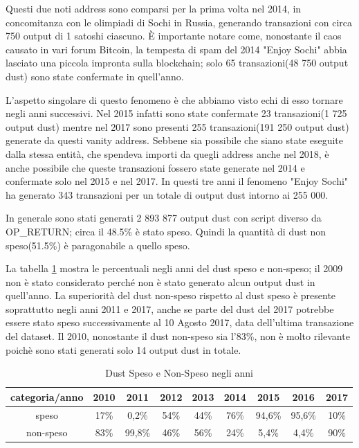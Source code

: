Questi due noti address sono comparsi per la prima volta nel 2014, in concomitanza con le olimpiadi di Sochi in Russia, generando transazioni con circa 750 output di 1 satoshi ciascuno. È importante notare come, nonostante il caos causato in vari forum Bitcoin, la tempesta di spam del 2014 "Enjoy Sochi" abbia lasciato una piccola impronta sulla blockchain; solo 65 transazioni(48 750 output dust) sono state confermate in quell'anno.

L'aspetto singolare di questo fenomeno è che abbiamo visto echi di esso tornare negli anni successivi. Nel 2015 infatti sono state confermate 23 transazioni(1 725 output dust) mentre nel 2017 sono presenti 255 transazioni(191 250 output dust) generate da questi vanity address. Sebbene sia possibile che siano state eseguite dalla stessa entità, che spendeva importi da quegli address anche nel 2018, è anche possibile che queste transazioni fossero state generate nel 2014 e confermate solo nel 2015 e nel 2017. In questi tre anni il fenomeno "Enjoy Sochi" ha generato 343 transazioni per un totale di output dust intorno ai 255 000.

In generale sono stati generati 2 893 877 output dust con script diverso da OP\_RETURN; circa il 48.5\% è stato speso. Quindi la quantità di dust non speso(51.5\%) è paragonabile a quello speso. 

La tabella \ref{tab:dust_spent_unspent} mostra le percentuali negli anni del dust speso e non-speso; il 2009 non è stato considerato perché non è stato generato alcun output dust in quell'anno. La superiorità del dust non-speso rispetto al dust speso è presente soprattutto negli anni 2011 e 2017, anche se parte del dust del 2017 potrebbe essere stato speso successivamente al 10 Agosto 2017, data dell'ultima transazione del dataset. Il 2010, nonostante il dust non-speso sia l'83\%, non è molto rilevante poichè sono stati generati solo 14 output dust in totale. 
\begin{table}[H]
    \centering
    \begin{tabular}{|c|c|c|c|c|c|c|c|c|}
        \hline
           categoria/anno   & 2010 & 2011 & 2012 & 2013 & 2014 & 2015 & 2016 & 2017\\
        \hline 
         speso &  17\% & 0,2\% & 54\% & 44\% & 76\% & 94,6\% & 95,6\% & 10\% \\
         \hline
         non-speso & 83\% & 99,8\% & 46\% & 56\% & 24\% & 5,4\% & 4,4\% & 90\%  \\
         \hline
    \end{tabular}
    \caption{Dust Speso e Non-Speso negli anni}
    \label{tab:dust_spent_unspent}
\end{table}
